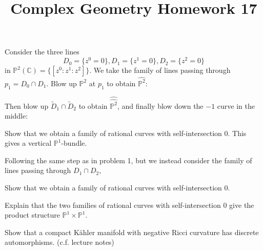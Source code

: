 \documentclass[12pt]{article}
\title{Complex Geometry Homework 17}
\author{}
\date{}
\begin{document}
\maketitle
\begin{problem}
  Consider the three lines \[
    D_0=\{z^0=0\},D_1=\{z^1=0\},D_2=\{z^2=0\}
  \] in \(\mathbb{P}^2(\mathbb{C})=\{[z^0:z^1:z^2]\}\). We take the family of
  lines passing through \(p_1=D_0\cap D_1\). Blow up \(\mathbb{P}^2\) at \(p_1\)
  to obtain \(\widehat{\mathbb{P}^2}\):
  \begin{center}
    
  \end{center}
  Then blow up \(\tilde{D}_1\cap \tilde{D}_2\) to obtain \(\widehat{\widehat
  {\mathbb{P}^2}}\), and finally blow down the \(-1\) curve in the middle:
  \begin{center}
    
  \end{center}
  Show that we obtain a family of rational curves with self-intersection 0.
  This gives a vertical \(\mathbb{P}^1\)-bundle.
\end{problem}
\begin{problem}
  Following the same step as in problem 1, but we instead consider the family
  of lines passing through \(D_1\cap D_2\),
  \begin{center}
    
  \end{center}
  Show that we obtain a family of rational curves with self-intersection 0.
\end{problem}
\begin{problem}
  Explain that the two families of rational curves with self-intersection 0
  give the product structure \(\mathbb{P}^1\times \mathbb{P}^1\).
\end{problem}
\begin{problem}
  Show that a compact Kähler manifold with negative Ricci curvature has
  discrete automorphisms. (c.f. lecture notes)
\end{problem}
\end{document}
